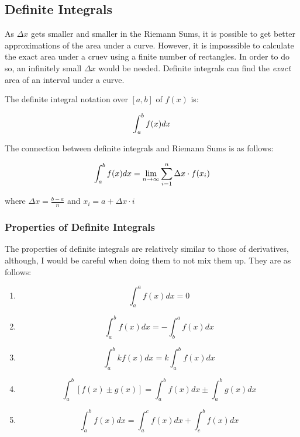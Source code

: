 \documentclass[12pt]{article}
\begin{document}
        \subsection{Definite Integrals}

        As $\Delta x$ gets smaller and smaller in the Riemann Sums, it is possible to get better approximations of the area under a curve.
        However, it is imposssible to calculate the exact area under a cruev using a finite number of rectangles. In order to do 
        so, an infinitely small $\Delta x$ would be needed. Definite integrals can find the \textit{exact} area of an interval under
        a curve. 

        The definite integral notation over $[a, b]$ of $f(x)$ is:

        \[
            \int_a^b f(x) \space dx
        \]
        
        The connection between definite integrals and Riemann Sums is as follows:

        \[
            \int_a^b f(x) \space dx = \lim_{n \to \infty} \sum_{i = 1}^{n} \Delta x \cdot f(x_i)    
        \]

        where $\Delta x = \frac{b - a}{n}$ and $x_i = a + \Delta x \cdot i$

        \subsubsection{Properties of Definite Integrals}

        The properties of definite integrals are relatively similar to those of derivatives, although,
        I would be careful when doing them to not mix them up. They are as follows:

        \begin{enumerate}
            
            \item 
            \[
                \int_a^a f(x) dx = 0    
            \]

            \item 

            \[
                \int_a^b f(x) dx = -\int_b^a f(x) dx    
            \]

            \item 

            \[
                \int_a^b kf(x) dx = k\int_a^b f(x) dx    
            \]

            \item 
            \[
                \int_a^b \left[f(x) \pm g(x)\right] = \int_a^b f(x) dx \pm \int_a^b g(x) dx
            \]

            \item
            \[
               \int_a^b f(x) dx = \int_a^c f(x)dx + \int_c^b f(x)dx
            \]

        \end{enumerate}
\end{document}
